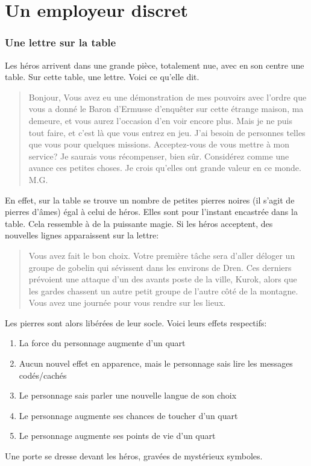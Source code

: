 \documentclass[a4paper, 11pt]{article}
\begin{document}
\part{Un employeur discret}
\section{Une lettre sur la table}
Les héros arrivent dans une grande pièce, totalement nue, avec en son centre une table. Sur cette table, une lettre. Voici ce qu'elle dit.
\begin{quotation}
Bonjour,
\newline
Vous avez eu une démonstration de mes pouvoirs avec l'ordre que vous a donné le Baron d'Ermusse d’enquêter sur cette étrange maison, ma demeure, et vous aurez l'occasion d'en voir encore plus. Mais je ne puis tout faire, et c'est là que vous entrez en jeu. J'ai besoin de personnes telles que vous pour quelques missions. Acceptez-vous de vous mettre à mon service?
\newline
Je saurais vous récompenser, bien sûr. Considérez comme une avance ces petites choses. Je crois qu'elles ont grande valeur en ce monde.
\newline
M.G.
\end{quotation}
En effet, sur la table se trouve un nombre de petites pierres noires (il s'agit de pierres d'âmes) égal à celui de héros. Elles sont pour l'instant encastrée dans la table. Cela ressemble à de la puissante magie. Si les héros acceptent, des nouvelles lignes apparaissent sur la lettre:
\begin{quotation}
Vous  avez fait le bon choix. Votre première tâche sera d'aller déloger un groupe de gobelin qui sévissent dans les environs de Dren. Ces derniers prévoient une attaque d'un des avants poste de la ville, Kurok, alors que les gardes chassent un autre petit groupe de l'autre côté de la montagne. Vous avez une journée pour vous rendre sur les lieux.
\end{quotation}
Les pierres sont alors libérées de leur socle. Voici leurs effets respectifs:
\begin{enumerate}
\item La force du personnage augmente d'un quart
\item Aucun nouvel effet en apparence, mais le personnage sais lire les messages codés/cachés
\item Le personnage sais parler une nouvelle langue de son choix
\item Le personnage augmente ses chances de toucher d'un quart
\item Le personnage augmente ses points de vie d'un quart
\end{enumerate}
Une porte se dresse devant les héros, gravées de mystérieux symboles.
\end{document}
